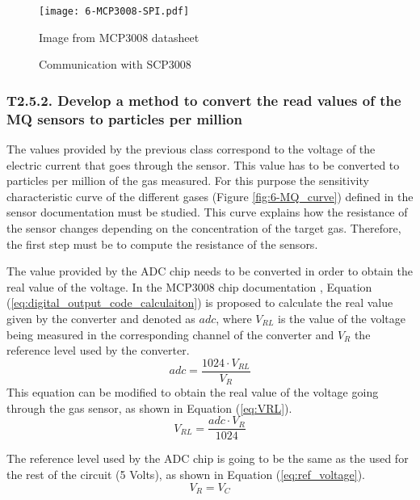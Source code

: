 \begin{figure}[!h]
	\begin{center}
		\texttt{[image: 6-MCP3008-SPI.pdf]}
		\caption{Communication with SCP3008}{Image from MCP3008 datasheet \cite{ADC}}
		\label{fig:6-MCP3008-SPI}
	\end{center}
\end{figure}




\subsubsection{T2.5.2. Develop a method to convert the read values of the MQ sensors to particles per million}
The values provided by the previous class correspond to the voltage of the electric current that goes through the sensor. This value has to be converted to particles per million of the gas measured. For this purpose the sensitivity characteristic curve of the different gases (Figure \ref{fig:6-MQ_curve}) defined in the sensor documentation must be studied. This curve explains how the resistance of the sensor changes depending on the concentration of the target gas. Therefore, the first step must be to compute the resistance of the sensors. 

The value provided by the \ac{ADC} chip needs to be converted in order to obtain the real value of the voltage. In the MCP3008 chip documentation \cite{ADC}, Equation (\ref{eq:digital_output_code_calculaiton}) is proposed to calculate the real value given by the converter and denoted as $adc$, where ${V}_{RL}$ is the value of the voltage being measured in the corresponding channel of the converter and ${V}_{R}$ the reference level used by the converter.
\begin{equation} \label{eq:digital_output_code_calculaiton}
adc = \frac { 1024\cdot { V }_{ RL } }{ { V }_{ R } } 
\end{equation}
This equation can be modified to obtain the real value of the voltage going through the gas sensor, as shown in Equation (\ref{eq:VRL}).
\begin{equation} \label{eq:VRL}
{ V }_{ RL } =\frac { adc \cdot  { V }_{ R }}{ 1024 }  
\end{equation}

The reference level used by the \ac{ADC} chip is going to be the same as the used for the rest of the circuit (5 Volts), as shown in Equation (\ref{eq:ref_voltage}).
\begin{equation} \label{eq:ref_voltage}
{V}_{R} = {V}_{C}
\end{equation}

